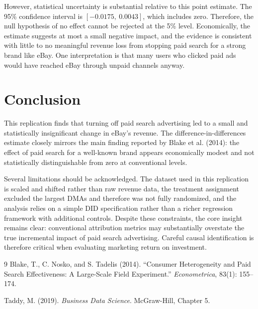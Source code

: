 \documentclass[12pt]{article}
\begin{document}
However, statistical uncertainty is substantial relative to this point estimate. The 95\% confidence interval is $[-0.0175,\ 0.0043]$, which includes zero. Therefore, the null hypothesis of no effect cannot be rejected at the 5\% level. Economically, the estimate suggests at most a small negative impact, and the evidence is consistent with little to no meaningful revenue loss from stopping paid search for a strong brand like eBay. One interpretation is that many users who clicked paid ads would have reached eBay through unpaid channels anyway.

\section{Conclusion}
This replication finds that turning off paid search advertising led to a small and statistically insignificant change in eBay’s revenue. The difference-in-differences estimate closely mirrors the main finding reported by Blake et al. (2014): the effect of paid search for a well-known brand appears economically modest and not statistically distinguishable from zero at conventional levels. 

Several limitations should be acknowledged. The dataset used in this replication is scaled and shifted rather than raw revenue data, the treatment assignment excluded the largest DMAs and therefore was not fully randomized, and the analysis relies on a simple DID specification rather than a richer regression framework with additional controls. Despite these constraints, the core insight remains clear: conventional attribution metrics may substantially overstate the true incremental impact of paid search advertising. Careful causal identification is therefore critical when evaluating marketing return on investment.

\begin{thebibliography}{9}
Blake, T., C. Nosko, and S. Tadelis (2014).
``Consumer Heterogeneity and Paid Search Effectiveness: A Large-Scale Field Experiment.''
\textit{Econometrica}, 83(1): 155--174.

Taddy, M. (2019).
\textit{Business Data Science}. McGraw-Hill, Chapter 5.
\end{thebibliography}
\end{document}
